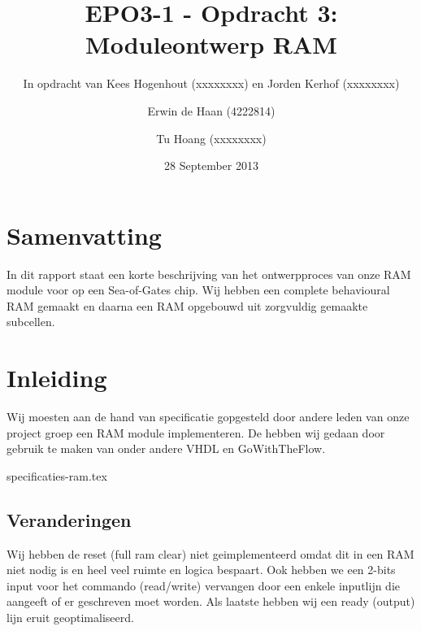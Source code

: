 \documentclass{scrartcl}  %
\author{Erwin {de Haan} (4222814) \and {Tu Hoang} (xxxxxxxx)}
\title{EPO3-1 - Opdracht 3: Moduleontwerp RAM}
\subtitle{In opdracht van Kees Hogenhout (xxxxxxxx) en Jorden Kerhof (xxxxxxxx)}
\date{28 September 2013}
\begin{document}
\maketitle
{}
\section*{Samenvatting}
In dit rapport staat een korte beschrijving van het ontwerpproces van onze RAM module voor op een Sea-of-Gates chip.
Wij hebben een complete behavioural RAM gemaakt en daarna een RAM opgebouwd uit zorgvuldig gemaakte subcellen.
\newpage
\setlength{\cftbeforetoctitleskip}{-3em}
\tableofcontents

\section{Inleiding}
Wij moesten aan de hand van specificatie gopgesteld door andere leden van onze project groep een RAM module implementeren.
De hebben wij gedaan door gebruik te maken van onder andere VHDL en GoWithTheFlow.

\newpage
{}

{specificaties-ram.tex}

\subsection{Veranderingen}
Wij hebben de reset (full ram clear) niet geimplementeerd omdat dit in een RAM niet nodig is en heel veel ruimte en logica bespaart.
Ook hebben we een 2-bits input voor het commando (read/write) vervangen door een enkele inputlijn die aangeeft of er geschreven moet worden.
Als laatste hebben wij een ready (output) lijn eruit geoptimaliseerd.
\end{document}
